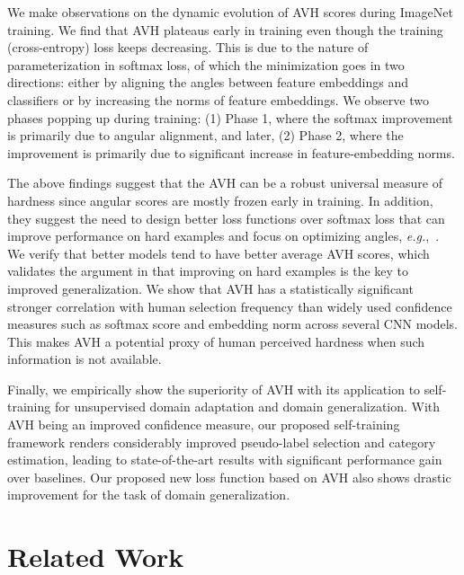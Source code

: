 We make observations on the dynamic evolution of AVH scores during ImageNet training. We find that AVH plateaus early in training even though the training (cross-entropy) loss keeps decreasing. This is due to the nature of parameterization in softmax loss, of which the minimization goes in two directions: either by aligning the angles between feature embeddings and classifiers or by increasing the norms of feature embeddings. We observe two phases popping up during training: (1) Phase 1, where the softmax improvement is primarily due to angular alignment, and later, (2) Phase 2, where the improvement is primarily due to significant increase in feature-embedding norms. 

The above findings suggest that the AVH can be a robust universal measure of hardness since angular scores are mostly frozen early in training. In addition, they suggest the need to design better loss functions over softmax loss that can improve performance on hard examples and focus on optimizing angles, \emph{e.g.},~\cite{sphereface,deng2019arcface,wang2018cosface,wang2018additive}. We verify that better models tend to have better average AVH scores, which validates the argument in \citep{recht2019imagenet} that improving on hard examples is the key to improved generalization. We show that AVH has a statistically significant stronger correlation with human selection frequency than widely used confidence measures such as softmax score and embedding norm across several CNN models. This makes AVH a potential proxy of human perceived hardness when such information is not available.

Finally, we empirically show the superiority of AVH with its application to self-training for unsupervised domain adaptation and domain generalization. With AVH being an improved confidence measure, our proposed self-training framework renders considerably improved pseudo-label selection and category estimation, leading to state-of-the-art results with significant performance gain over baselines. Our proposed new loss function based on AVH also shows drastic improvement for the task of domain generalization.

\section{Related Work}


